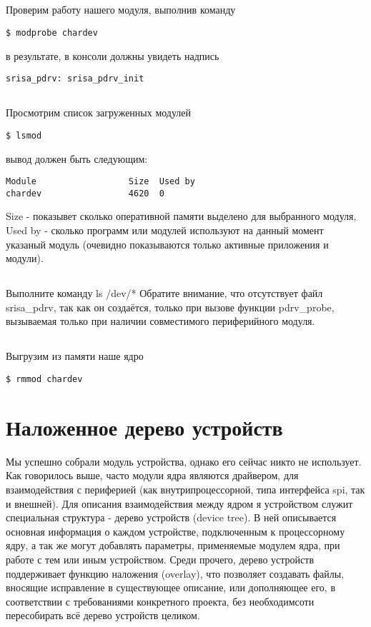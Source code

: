 \subsection{}Проверим работу нашего модуля, выполнив команду
\begin{lstlisting}[style=bash]
$ modprobe chardev
\end{lstlisting}
в результате, в консоли должны увидеть надпись 
\begin{lstlisting}[style=stdout]
srisa_pdrv: srisa_pdrv_init
\end{lstlisting}

\subsection{}Просмотрим список загруженных модулей
\begin{lstlisting}[style=bash]
$ lsmod
\end{lstlisting}
вывод должен быть следующим:
\begin{lstlisting}[style=stdout]
Module                  Size  Used by
chardev                 4620  0
\end{lstlisting}
Size - показывет сколько оперативной памяти выделено для выбранного модуля, Used by - сколько программ или модулей используют на данный момент указаный модуль (очевидно показываются только активные приложения и модули). 

\subsection{}Выполните команду ls /dev/* Обратите внимание, что отсутствует файл srisa\_pdrv, так как он создаётся, только при вызове функции pdrv\_probe, вызываемая только при наличии совместимого периферийного модуля.

\subsection{}Выгрузим из памяти наше ядро
\begin{lstlisting}[style=bash]
$ rmmod chardev
\end{lstlisting}

\section{Наложенное дерево устройств}
Мы успешно собрали модуль устройства, однако его сейчас никто не использует. Как говорилось выше, часто модули ядра являются драйвером, для взаимодействия с периферией (как внутрипроцессорной, типа интерфейса spi, так и внешней). Для описания взаимодействия между ядром я устройством служит специальная структура - дерево устройств (device tree). В ней описывается основная информация о каждом устройстве, подключенным к процессорному ядру, а так же могут добавлять параметры, применяемые модулем ядра, при работе с тем или иным устройством. Среди прочего, дерево устройств поддерживает функцию наложения (overlay), что позволяет создавать файлы, вносящие исправление в существующее описание, или дополняющее его, в соответствии с требованиями конкретного проекта, без необходимсоти пересобирать всё дерево устройств целиком.

